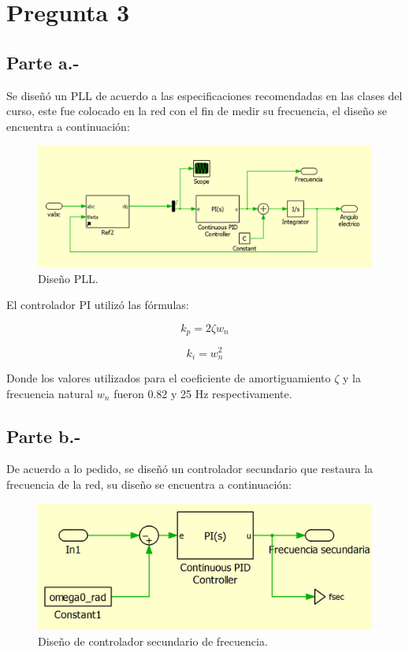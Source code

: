 \section{Pregunta 3}

\subsection{Parte a.-}

Se diseñó un PLL de acuerdo a las especificaciones recomendadas en las clases del curso, este fue colocado en la red con el fin de medir su frecuencia, el diseño se encuentra a continuación:

\begin{figure}
   \centering
   \includegraphics[width=0.5\linewidth]{Tarea 1/report/imagenes/p3a/pllred.png}
   \caption{Diseño PLL.}
   \label{diseñopll}
\end{figure}

El controlador PI utilizó las fórmulas:

\begin{equation}
    k_p = 2\zeta w_{n}
\end{equation}

\begin{equation}
    k_i = w_{n}^2
\end{equation}

Donde los valores utilizados para el coeficiente de amortiguamiento $\zeta$ y la frecuencia natural $w_{n}$ fueron 0.82 y 25 Hz respectivamente.\\

\subsection{Parte b.-}

De acuerdo a lo pedido, se diseñó un controlador secundario que restaura la frecuencia de la red, su diseño se encuentra a continuación:

\begin{figure}
   \centering
   \includegraphics[width=0.5\linewidth]{Tarea 1/report/imagenes/p3b/secundario frecuencia.png}
   \caption{Diseño de controlador secundario de frecuencia.}
   \label{diseñosecfrecuencia}
\end{figure}

